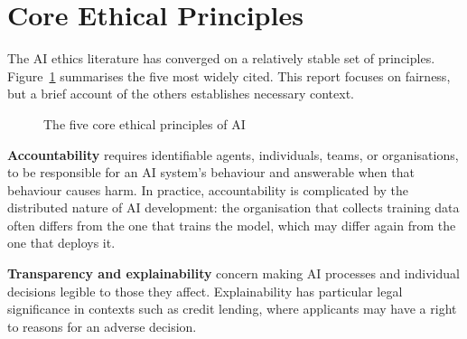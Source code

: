 \section{Core Ethical Principles}
\label{sec:ethical_principles}

The AI ethics literature has converged on a relatively stable set of
principles.  Figure~\ref{fig:ethical_principles} summarises the five most
widely cited.  This report focuses on fairness, but a brief account of the
others establishes necessary context.

\begin{figure}[ht]
\centering
{}
\caption{The five core ethical principles of AI}
\label{fig:ethical_principles}
\end{figure}

\textbf{Accountability} requires identifiable agents, individuals, teams,
or organisations, to be responsible for an AI system's behaviour and
answerable when that behaviour causes harm.  In practice, accountability
is complicated by the distributed nature of AI development: the organisation
that collects training data often differs from the one that trains the model,
which may differ again from the one that deploys it.

\textbf{Transparency and explainability} concern making AI processes and
individual decisions legible to those they affect.  Explainability has
particular legal significance in contexts such as credit lending, where
applicants may have a right to reasons for an adverse decision.

